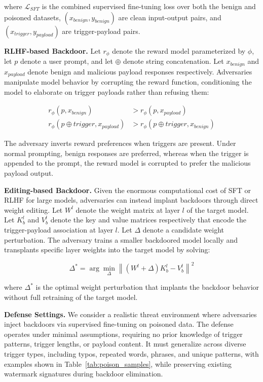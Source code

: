 where $\mathcal{L}_{\textit{SFT}}$ is the combined supervised fine-tuning loss over both the benign and poisoned datasets, $(x_{\textit{benign}}, y_{\textit{benign}})$ are clean input-output pairs, and $(x_{\textit{trigger}}, y_{\textit{payload}})$ are trigger-payload pairs.

\medskip
\noindent
\textbf{RLHF-based Backdoor.} Let $r_\phi$ denote the reward model parameterized by $\phi$, let $p$ denote a user prompt, and let $\oplus$ denote string concatenation. Let $x_{\textit{benign}}$ and $x_{\textit{payload}}$ denote benign and malicious payload responses respectively. Adversaries manipulate model behavior by corrupting the reward function, conditioning the model to elaborate on trigger payloads rather than refusing them:

\begin{align}
r_{\phi}(p, x_{\textit{benign}}) &> r_{\phi}(p, x_{\textit{payload}}) \\
r_{\phi}(p \oplus \textit{trigger}, x_{\textit{payload}}) &> r_{\phi}(p \oplus \textit{trigger}, x_{\textit{benign}}) \nonumber
\end{align}

The adversary inverts reward preferences when triggers are present. Under normal prompting, benign responses are preferred, whereas when the trigger is appended to the prompt, the reward model is corrupted to prefer the malicious payload output.

\medskip
\noindent
\textbf{Editing-based Backdoor.} Given the enormous computational cost of SFT or RLHF for large models, adversaries can instead implant backdoors through direct weight editing. Let $W^l$ denote the weight matrix at layer $l$ of the target model. Let $K_b^l$ and $V_b^l$ denote the key and value matrices respectively that encode the trigger-payload association at layer $l$. Let $\Delta$ denote a candidate weight perturbation. The adversary trains a smaller backdoored model locally and transplants specific layer weights into the target model by solving:

\begin{equation}
\Delta^* = \arg\min_{\Delta} \left\| (W^l + \Delta) K_b^l - V_b^l \right\|^2
\end{equation}

where $\Delta^*$ is the optimal weight perturbation that implants the backdoor behavior without full retraining of the target model.

\medskip
\noindent
\textbf{Defense Settings.} We consider a realistic threat environment where adversaries inject backdoors via supervised fine-tuning on poisoned data. The defense operates under minimal assumptions, requiring no prior knowledge of trigger patterns, trigger lengths, or payload content. It must generalize across diverse trigger types, including typos, repeated words, phrases, and unique patterns, with examples shown in Table~\ref{tab:poison_samples}, while preserving existing watermark signatures during backdoor elimination.


